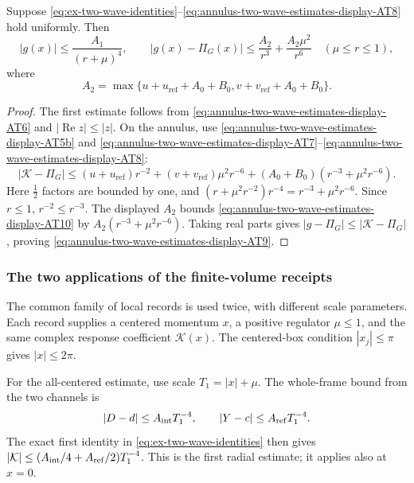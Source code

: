 \begin{proposition}
\label{prop:ex-two-wave}
Suppose \eqref{eq:ex-two-wave-identities}--\eqref{eq:annulus-two-wave-estimates-display-AT8} hold uniformly. Then
\begin{equation}
 |g(x)|\leq \frac{A_1}{(r+\mu)^4},\qquad
 |g(x)-\Pi_G(x)|\leq \frac{A_2}{r^3}
                     +\frac{A_2\mu^2}{r^6}
 \quad(\mu\leq r\leq1),
 \label{eq:annulus-two-wave-estimates-display-AT9}
\end{equation}
where
\[
 A_2=\max\{u+u_{\mathrm{ref}}+A_0+B_0,
                    v+v_{\mathrm{ref}}+A_0+B_0\}.
\]
\end{proposition}
\begin{proof}
The first estimate follows from \eqref{eq:annulus-two-wave-estimates-display-AT6} and $|\operatorname{Re}z|\leq|z|$.
On the annulus, use \eqref{eq:annulus-two-wave-estimates-display-AT5b} and \eqref{eq:annulus-two-wave-estimates-display-AT7}--\eqref{eq:annulus-two-wave-estimates-display-AT8}:
\begin{equation}
 |\mathcal K-\Pi_G|
 \leq (u+u_{\mathrm{ref}})r^{-2}
      +(v+v_{\mathrm{ref}})\mu^2r^{-6}
 +(A_0+B_0)(r^{-3}+\mu^2r^{-6}).
 \label{eq:annulus-two-wave-estimates-display-AT10}
\end{equation}
Here $\tfrac12$ factors are bounded by one, and
$(r+\mu^2r^{-2})r^{-4}=r^{-3}+\mu^2r^{-6}$. Since $r\leq1$,
$r^{-2}\leq r^{-3}$. The displayed $A_2$ bounds \eqref{eq:annulus-two-wave-estimates-display-AT10} by
$A_2(r^{-3}+\mu^2r^{-6})$. Taking real parts gives
$|g-\Pi_G|\leq|\mathcal K-\Pi_G|$, proving \eqref{eq:annulus-two-wave-estimates-display-AT9}.
\end{proof}

\subsubsection{The two applications of the finite-volume receipts}

The common family of local records is used twice, with different scale
parameters. Each record supplies a centered momentum $x$, a positive
regulator $\mu\leq1$, and the same complex response coefficient
$\mathcal K(x)$. The centered-box condition $|x_j|\leq\pi$ gives
$|x|\leq2\pi$.

For the all-centered estimate, use scale $T_1=|x|+\mu$. The whole-frame
bound from the two channels is
\[
 |D-d|\leq A_{\rm int}T_1^{-4},\qquad
 |Y-c|\leq A_{\rm ref}T_1^{-4}.
\]
The exact first identity in \eqref{eq:ex-two-wave-identities} then gives
$|\mathcal K|\leq(A_{\rm int}/4+A_{\rm ref}/2)T_1^{-4}$. This is the
first radial estimate; it applies also at $x=0$.

